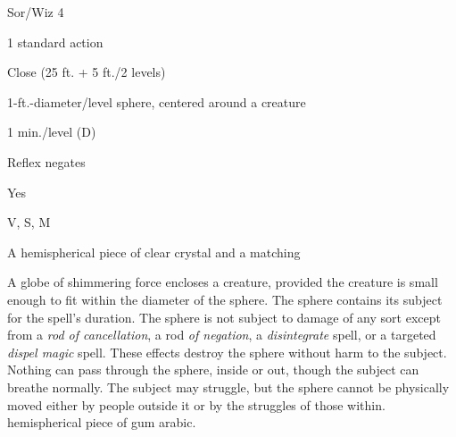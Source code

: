 
\begin{description*}
\item[Level:] Sor/Wiz 4
\item[Casting Time:] 1 standard action
\item[Range:] Close (25 ft. + 5 ft./2 levels)
\item[Effect:] 1-ft.-diameter/level sphere, centered around a creature
\item[Duration:] 1 min./level (D)
\item[Saving Throw:] Reflex negates
\item[Spell Resistance:] Yes
\item[Components:] V, S, M
\item[Arcane Material Component:] A hemispherical piece of clear crystal and a matching
\end{description*}

A globe of shimmering force encloses a creature, provided the creature is small
enough to fit within the diameter of the sphere. The sphere contains its subject
for the spell's duration. The sphere is not subject to damage of any sort except
from a \textit{rod of cancellation}, a rod \textit{of negation}, a \textit{disintegrate
}spell, or a targeted \textit{dispel magic} spell. These effects destroy the sphere
without harm to the subject. Nothing can pass through the sphere, inside or out,
though the subject can breathe normally.
The subject may struggle, but the sphere cannot be physically moved either by people
outside it or by the struggles of those within.
hemispherical piece of gum arabic.